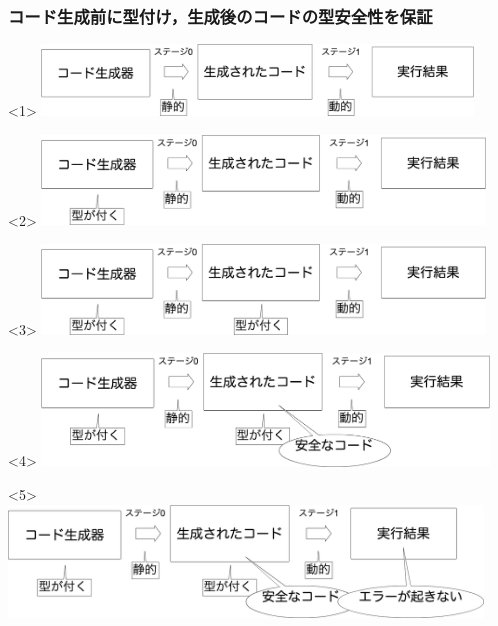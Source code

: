 \begin{frame}
  \frametitle{コード生成前に型付け，生成後のコードの型安全性を保証}
  \begin{onlyenv}<1>
    \center
    \includegraphics[clip,height=1.9cm]{./img/prggen.png}
  \end{onlyenv}

  \begin{onlyenv}<2>
    \center
    \includegraphics[clip,height=2.4cm]{./img/prggen_type1.png}
  \end{onlyenv}

  \begin{onlyenv}<3>
    \center
    \includegraphics[clip,height=2.4cm]{./img/prggen_type2.png}
  \end{onlyenv}

  \begin{onlyenv}<4>
    \center
    \includegraphics[clip,height=3.0cm]{./img/prggen_type3.png}
  \end{onlyenv}

  \begin{onlyenv}<5>
    \center
    \includegraphics[clip,height=3.0cm]{./img/prggen_type4.png}
  \end{onlyenv}
\end{frame}

